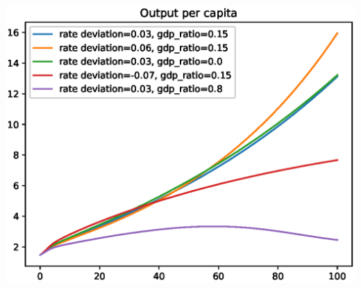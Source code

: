 \documentclass[12pt]{article}
\theoremstyle{definition}
\begin{document}
\begin{minipage}[c]{0.8\linewidth}
\begin{framed}
\centering
\includegraphics[width=1\textwidth]{images/economy_0}
\end{framed}
\end{minipage}
\end{document}

